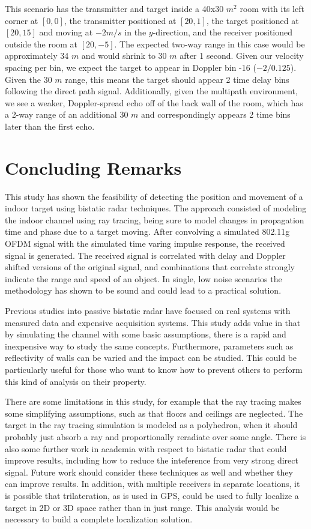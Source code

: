 \documentclass[article,11pt,onecolumn,final]{IEEEtran}
\begin{document}
This scenario has the transmitter and target inside a 40x30 $m^2$ room with its left corner at $[0, 0]$, the transmitter positioned at $[20, 1]$, the target positioned at $[20, 15]$ and moving at $-2 m/s$ in the $y$-direction, and the receiver positioned outside the room at $[20, -5]$. The expected two-way range in this case would be approximately 34 $m$ and would shrink to 30 $m$ after 1 second. Given our velocity spacing per bin, we expect the target to appear in Doppler bin -16 ($-2 / 0.125$). Given the 30 $m$ range, this means the target should appear 2 time delay bins following the direct path signal. Additionally, given the multipath environment, we see a weaker, Doppler-spread echo off of the back wall of the room, which has a 2-way range of an additional 30 $m$ and correspondingly appears 2 time bins later than the first echo.

\section{Concluding Remarks}
This study has shown the feasibility of detecting the position and movement of a indoor target using bistatic
radar techniques. The approach consisted of modeling the indoor channel using ray tracing, being sure to 
model changes in propagation time and phase due to a target moving. After convolving a simulated 802.11g
OFDM signal with the simulated time varing impulse response, the received signal is generated. The received
signal is correlated with delay and Doppler shifted versions of the original signal, and combinations that correlate
strongly indicate the range and speed of an object. In single, low noise scenarios the methodology has shown
to be sound and could lead to a practical solution.

Previous studies into passive bistatic radar have focused on real systems with measured data and expensive
acquisition systems. This study adds value in that by simulating the channel with some basic assumptions, there 
is a rapid and inexpensive way to study the same concepts. Furthermore, parameters such as reflectivity of
walls can be varied and the impact can be studied. This could be particularly useful for those who want to know
how to prevent others to perform this kind of analysis on their property.

There are some limitations in this study, for example that the ray tracing makes some simplifying assumptions, 
such as that floors and ceilings are neglected. The target in the ray tracing simulation is modeled as a polyhedron, when it should probably just absorb a ray and proportionally reradiate over some angle. There is also some further work in academia with respect to bistatic
radar that could improve results, including how to reduce the inteference from very strong direct signal. Future work
should consider these techniques as well and whether they can improve results. In addition, with multiple receivers
in separate locations, it is possible that trilateration, as is used in GPS, could be used to fully localize a target in 2D or 3D space rather than in just range. This analysis would be necessary to build a complete localization solution.
\end{document}
